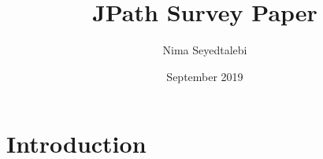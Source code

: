 \documentclass{article}
\title{JPath Survey Paper}
\author{Nima Seyedtalebi}
\date{September 2019}
\begin{document}
\maketitle

\section{Introduction}
\end{document}
